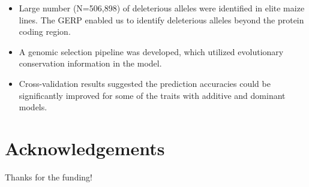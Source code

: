 \documentclass[a0,portrait]{a0poster}
\begin{document}
\begin{multicols}{2}
\begin{itemize}
\item Large number (N=506,898) of deleterious alleles were identified in elite maize lines. The GERP enabled us to identify deleterious alleles beyond the protein coding region.
\item A genomic selection pipeline was developed, which utilized evolutionary conservation information in the model.
\item Cross-validation results suggested the prediction accuracies could be significantly improved for some of the traits with additive and dominant models. 


\end{itemize}

\color{DarkSlateGray} %








\section*{Acknowledgements}

Thanks for the funding!


\end{multicols}
\end{document}
